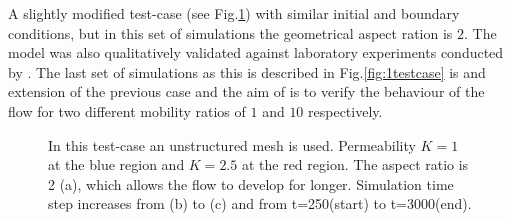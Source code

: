 \documentclass[preprint,authoryear,12pt]{elsarticle}
\begin{document}
\medskip
A slightly modified test-case (see Fig.\ref{fig:testcase}) with similar initial and boundary conditions, but in this set of simulations the geometrical aspect ration is $2$. The model was also qualitatively validated against laboratory experiments conducted by \citet{evans_1994}. The last set of simulations as this is described in Fig.\ref{fig:1testcase} is and extension of the previous case and the aim of is to verify the behaviour of the flow for two different mobility ratios of $1$ and $10$ respectively.

\begin{figure}[h]
\begin{center}
\caption{In this test-case an unstructured mesh is used. Permeability $K=1$ at the blue region and $K=2.5$ at the red region. The aspect ratio is 2 (a), which allows the flow to develop for longer. Simulation time step increases from (b) to (c) and from t=250(start) to t=3000(end).}
\label{fig:testcase}
\end{center}
\end{figure}
\end{document}
